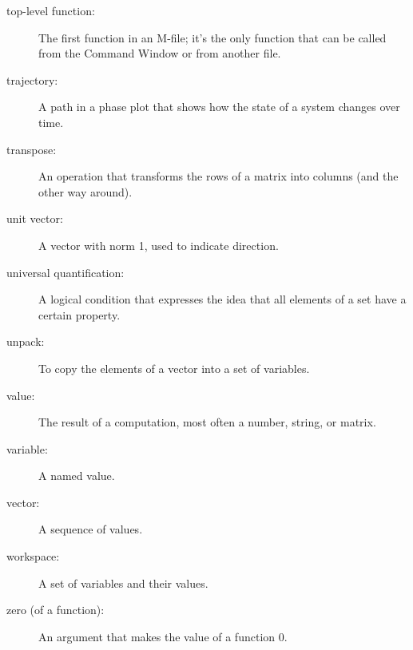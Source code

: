 \begin{description}
\item[top-level function:]  The first function in an M-file;
it's the only function that can be called from the Command
Window or from another file.

\item[trajectory:] A path in a phase plot that shows how the state of
a system changes over time.

\item[transpose:] An operation that transforms the rows of a matrix
into columns (and the other way around).

\item[unit vector:] A vector with norm 1, used to indicate
direction.

\item[universal quantification:] A logical condition that expresses
the idea that all elements of a set have a certain property.

\item[unpack:] To copy the elements of a vector into a set of variables.

\item[value:] The result of a computation, most often a number, string, or matrix.

\item[variable:] A named value.

\item[vector:] A sequence of values.

\item[workspace:] A set of variables and their values.

\item[zero (of a function):] An argument that makes the value of a function $0$.

\end{description}

